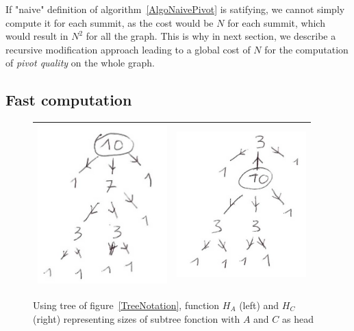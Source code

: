\documentclass[a4paper]{article}
\begin{document}
If "naive" definition of algorithm~\ref{AlgoNaivePivot} is satifying, we cannot simply compute
it for each summit, as the cost would be $N$ for each summit, which would result
in $N^2$ for all the graph.  This is why in next section, we  describe a recursive 
modification approach  leading to a global cost of $N$ for the computation of \emph{pivot quality}
on the whole graph.


\subsection{Fast computation}

\begin{figure}
\centering
\begin{tabular}{||c|c||}
 \hline \hline
\includegraphics[width=5cm]{FIGS/FTD-HeritA.jpg} &
\includegraphics[width=5cm]{FIGS/FTD-HeritC.jpg} 
 \\ \hline \hline
\end{tabular}
\caption{Using tree of figure~\ref{TreeNotation}, function $H_A$ (left) and $H_C$ (right) representing
 sizes of subtree fonction with $A$ and $C$ as head}
\label{TreeHerit}
\end{figure}
\end{document}
